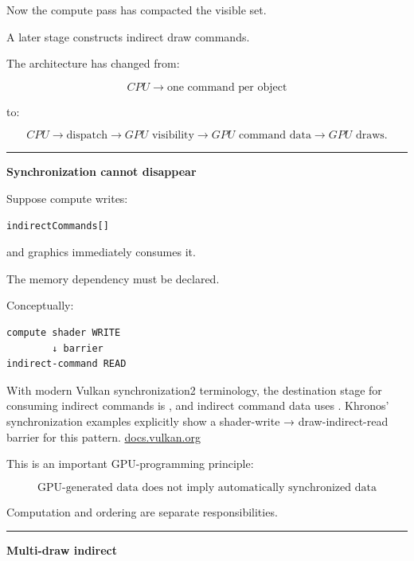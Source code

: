 Now the compute pass has compacted the visible set.

A later stage constructs indirect draw commands.

The architecture has changed from:

\[
CPU\rightarrow\text{one command per object}
\]

to:

\[
CPU\rightarrow\text{dispatch}
\rightarrow
GPU\text{ visibility}
\rightarrow
GPU\text{ command data}
\rightarrow
GPU\text{ draws}.
\]

\begin{center}\rule{0.5\linewidth}{0.5pt}\end{center}

\textbf{Synchronization cannot disappear}

Suppose compute writes:

\begin{verbatim}
indirectCommands[]
\end{verbatim}

and graphics immediately consumes it.

The memory dependency must be declared.

Conceptually:

\begin{verbatim}
compute shader WRITE
        ↓ barrier
indirect-command READ
\end{verbatim}

With modern Vulkan synchronization2 terminology, the destination stage for consuming indirect commands is , and indirect command data uses . Khronos' synchronization examples explicitly show a shader-write → draw-indirect-read barrier for this pattern. \href{https://docs.vulkan.org/spec/latest/chapters/synchronization.html?utm_source=chatgpt.com}{docs.vulkan.org}

This is an important GPU-programming principle:

\[
\boxed{
\text{GPU-generated data does not imply automatically synchronized data}
}
\]

Computation and ordering are separate responsibilities.

\begin{center}\rule{0.5\linewidth}{0.5pt}\end{center}

\textbf{Multi-draw indirect}

